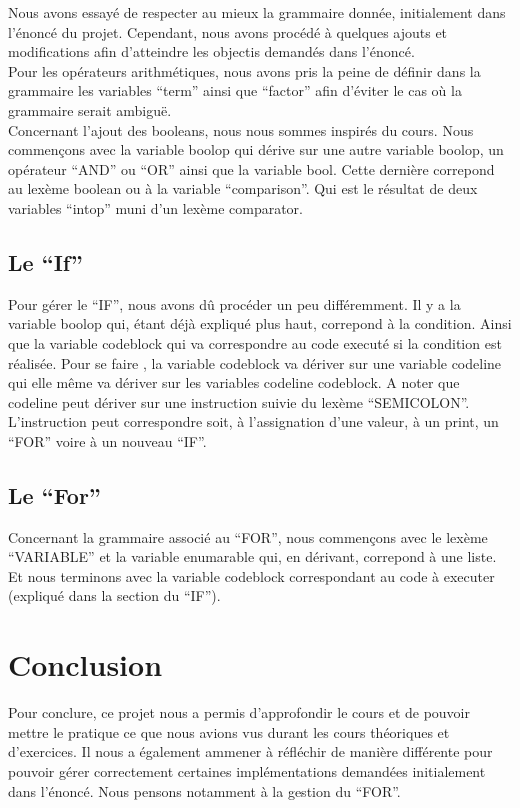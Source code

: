 \documentclass[10pt,a4paper]{article}
\begin{document}
	Nous avons essayé de respecter au mieux la grammaire donnée, initialement dans l'énoncé du projet.
	Cependant, nous avons procédé à quelques ajouts et modifications afin d'atteindre les objectis demandés dans 
	l'énoncé.\\
	Pour les opérateurs arithmétiques, nous avons pris la peine de définir dans la grammaire les variables ``term'' ainsi que ``factor'' afin d'éviter
	le cas où la grammaire serait ambiguë.\\
	Concernant l'ajout des booleans, nous nous sommes inspirés du cours. Nous commençons avec la variable boolop qui dérive sur une autre variable
	boolop, un opérateur ``AND'' ou ``OR'' ainsi que la variable bool. Cette dernière correpond au lexème boolean ou à la variable ``comparison''.
	Qui est le résultat de deux variables ``intop'' muni d'un lexème comparator.
	\subsection{Le ``If''}
	Pour gérer le ``IF'', nous avons dû procéder un peu différemment. Il y a la variable boolop qui, étant déjà expliqué plus haut, correpond à la condition.
	Ainsi que la variable codeblock qui va correspondre au code executé si la condition est réalisée. Pour se faire , la variable codeblock va dériver
	sur une variable codeline qui elle même va dériver sur les variables codeline codeblock. A noter que codeline peut dériver sur une instruction
	suivie du lexème ``SEMICOLON''. L'instruction peut correspondre soit, à l'assignation d'une valeur, à un print, un ``FOR'' voire à un nouveau ``IF''.
	\\
	\subsection{Le ``For''}
	Concernant la grammaire associé au ``FOR'', nous commençons avec le lexème ``VARIABLE'' et la variable enumarable qui, en dérivant, correpond à une liste.
	Et nous terminons avec la variable codeblock correspondant au code à executer (expliqué dans la section du ``IF'').
	\\
	\section{Conclusion}
	Pour conclure, ce projet nous a permis d'approfondir le cours et de pouvoir mettre le pratique ce que nous avions vus durant les cours théoriques 
	et d'exercices. Il nous a également ammener à réfléchir de manière différente pour pouvoir gérer correctement certaines implémentations demandées
	initialement dans l'énoncé. Nous pensons notamment à la gestion du ``FOR''.
	
\end{document}
